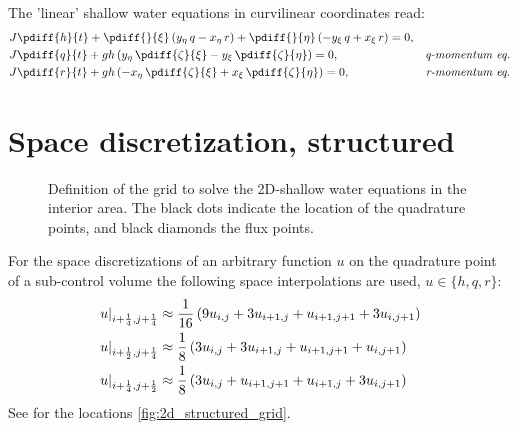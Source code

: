 The 'linear' shallow water equations in curvilinear coordinates read:
\begin{align}
&J \pdiff{h}{t} +\pdiff{}{\xi} \left( y_{\eta}\, q - x_{\eta}\, r \right) + \pdiff{}{\eta} \left( -y_{\xi}\, q + x_{\xi}\, r \right) = 0,
\label{eq:continuity_curvi}
\\*
&J \pdiff{q}{t} + g h \left( y_{\eta}\, \pdiff{\zeta}{\xi} - y_{\xi}\, \pdiff{\zeta}{\eta} \right) = 0, & \textit{q-momentum eq.}
 \label{eq:q_momentum_curvi}
\\*
&J \pdiff{r}{t} + g h \left( -x_{\eta}\, \pdiff{\zeta}{\xi} + x_{\xi}\, \pdiff{\zeta}{\eta} \right) = 0, & \textit{r-momentum eq.}
 \label{eq:r_momentum_curvi}
\end{align}

\section{Space discretization, structured}
\begin{figure}[h]
    \begin{center}
        \def\svgwidth{0.80\textwidth} %
    \end{center}
    \caption[Definition of the grid to solve the 2D-shallow water equations in the interior area]{Definition of the grid to solve the 2D-shallow water equations in the interior area. The black dots indicate the location of the quadrature points, and black diamonds the flux points.}
    \label{fig:2d_structured_grid}
\end{figure}
For the space discretizations of an arbitrary function $u$ on the quadrature point of a sub-control volume the following space interpolations are used, $u \in \{h,q,r\}$:
\begin{align}
    \left. u\right|_{i+\frac{1}{4}, j+\frac{1}{4}} & \approx \frac{1}{16}\left( 9u_{i, j} + 3 u_{i+1,j} + u_{i+1, j+1} + 3  u_{i, j+1}\right)
    \\
    \left.u\right|_{i+\frac{1}{2}, j+\frac{1}{4}} & \approx \frac{1}{8} \left( 3 u_{i,j} + 3 u_{i+1,j} + u_{i+1, j+1} + u_{i, j+1} \right)
    \\
    \left. u \right|_{i+\frac{1}{4}, j+\frac{1}{2}} & \approx \frac{1}{8} \left( 3 u_{i, j} + u_{i+1, j+1} + u_{i+1, j}  + 3 u_{i, j+1} \right)
\end{align}
See for the locations \autoref{fig:2d_structured_grid}.
